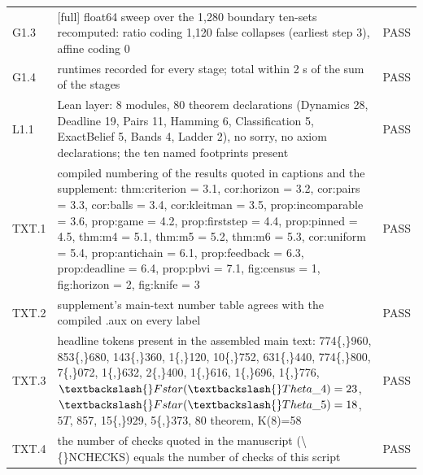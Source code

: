 \documentclass[11pt,a4paper]{article}
\theoremstyle{plain}
\theoremstyle{definition}
\theoremstyle{remark}
\begin{document}
{\begin{longtable}{@{}l p{} l@{}}
G1.3 & [full] float64 sweep over the 1,280 boundary ten-sets recomputed: ratio coding 1,120 false collapses (earliest step 3), affine coding 0 & PASS\\
G1.4 & runtimes recorded for every stage; total within 2 s of the sum of the stages & PASS\\
L1.1 & Lean layer: 8 modules, 80 theorem declarations (Dynamics 28, Deadline 19, Pairs 11, Hamming 6, Classification 5, ExactBelief 5, Bands 4, Ladder 2), no sorry, no axiom declarations; the ten named footprints present & PASS\\
TXT.1 & compiled numbering of the results quoted in captions and the supplement: thm:criterion = 3.1, cor:horizon = 3.2, cor:pairs = 3.3, cor:balls = 3.4, cor:kleitman = 3.5, prop:incomparable = 3.6, prop:game = 4.2, prop:firststep = 4.4, prop:pinned = 4.5, thm:m4 = 5.1, thm:m5 = 5.2, thm:m6 = 5.3, cor:uniform = 5.4, prop:antichain = 6.1, prop:feedback = 6.3, prop:deadline = 6.4, prop:pbvi = 7.1, fig:census = 1, fig:horizon = 2, fig:knife = 3 & PASS\\
TXT.2 & supplement's main-text number table agrees with the compiled .aux on every label & PASS\\
TXT.3 & headline tokens present in the assembled main text: 774\{,\}960, 853\{,\}680, 143\{,\}360, 1\{,\}120, 10\{,\}752, 631\{,\}440, 774\{,\}800, 7\{,\}072, 1\{,\}632, 2\{,\}400, 1\{,\}616, 1\{,\}696, 1\{,\}776, $\textbackslash\{\}Fstar(\textbackslash\{\}Theta\_4)=23$, $\textbackslash\{\}Fstar(\textbackslash\{\}Theta\_5)=18$, $5T$, 857, 15\{,\}929, 5\{,\}373, $80$ theorem, K(8)=58 & PASS\\
TXT.4 & the number of checks quoted in the manuscript (\textbackslash\{\}NCHECKS) equals the number of checks of this script & PASS\\
\end{longtable}
}
\end{document}
